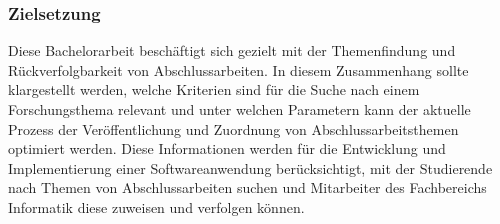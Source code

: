 \newpage
\subsubsection{Zielsetzung}
Diese Bachelorarbeit besch\"aftigt sich gezielt mit der Themenfindung und R\"uckverfolgbarkeit von Abschlussarbeiten. In diesem Zusammenhang sollte klargestellt werden, welche Kriterien sind f\"ur die Suche nach einem Forschungsthema relevant und unter welchen Parametern kann der aktuelle Prozess der Ver\"offentlichung und Zuordnung von Abschlussarbeitsthemen optimiert werden. Diese Informationen werden f\"ur die Entwicklung und Implementierung einer Softwareanwendung ber\"ucksichtigt, mit der Studierende nach Themen von Abschlussarbeiten suchen und Mitarbeiter des Fachbereichs Informatik diese zuweisen und verfolgen k\"onnen.

